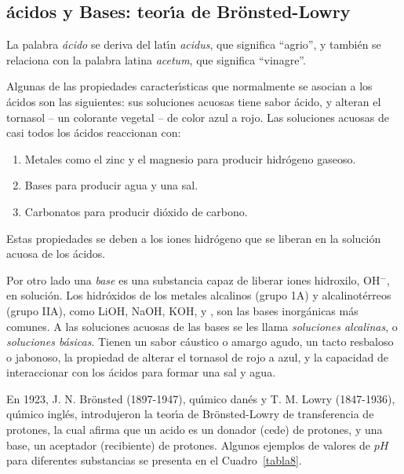 \subsection{\'acidos y Bases: teor\'{\i}a de Br\"onsted-Lowry}
La palabra
\textit{\'acido} se deriva del lat\'{\i}n
\textit{acidus}, que significa ``agrio'', y tambi\'en se
relaciona con la palabra latina \textit{acetum}, que 
significa ``vinagre''.

Algunas de las propiedades caracter\'{\i}sticas que normalmente se asocian a los \'acidos son las siguientes:
sus soluciones acuosas tiene sabor \'acido, y alteran el  tornasol -- un colorante vegetal -- de color azul a rojo. Las soluciones acuosas de casi todos los \'acidos reaccionan con:
\begin{enumerate}
\item Metales como el zinc y el magnesio para producir hidr\'ogeno
gaseoso.
\item Bases para producir agua y una sal.
\item Carbonatos para producir di\'oxido de carbono.
\end{enumerate}
Estas propiedades se deben a los iones hidr\'ogeno que se liberan  en la soluci\'on acuosa de los \'acidos.

Por otro lado una \textit{base} es una substancia capaz de liberar iones hidroxilo, OH$^-$, en soluci\'on. Los hidr\'oxidos de los metales alcalinos (grupo 1A) y alcalinot\'erreos (grupo IIA), como LiOH, NaOH, KOH,  y , son las bases inorg\'anicas m\'as comunes. A las soluciones acuosas de las bases se les llama \textit{soluciones alcalinas}, o \textit{soluciones b\'asicas}. Tienen un sabor c\'austico o amargo agudo, un tacto resbaloso o jabonoso, la propiedad de alterar el tornasol de rojo a azul, y la capacidad de interaccionar con los \'acidos para formar una sal y agua.

En 1923, J. N. Br\"onsted (1897-1947), qu\'{\i}mico dan\'es y T. M. Lowry (1847-1936), qu\'{\i}mico ingl\'es, introdujeron la teor\'{\i}a de  Br\"onsted-Lowry de transferencia de protones, la cual afirma que un   \gls{acido} es un donador (cede) de protones, y una base, un aceptador (recibiente) de protones. Algunos ejemplos de valores de $pH$ para diferentes substancias se presenta en el Cuadro~\ref{tabla8}.


